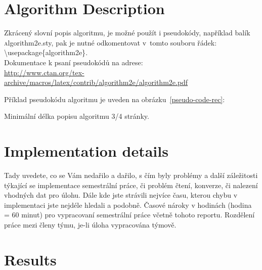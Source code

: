 \documentclass[report,11pt]{elsarticle}
\begin{document}
\section{\label{SEC:Description}Algorithm Description}

Zkrácený slovní popis algoritmu, je možné použít i pseudokódy,
například balík {\textsc algorithm2e.sty}, pak je nutné odkomentovat
v~tomto souboru řádek:\\

{\textsc \textbackslash usepackage\{algorithm2e\}}.\\

Dokumentace k psaní pseudokódů na adrese:\\

\url{http://www.ctan.org/tex-archive/macros/latex/contrib/algorithm2e/algorithm2e.pdf}

Příklad pseudokódu algoritmu je uveden na obrázku~\ref{pseudo-code-rec}:



Minimální délka popisu algoritmu 3/4 stránky.

\section{\label{SEC:Pitfalls}Implementation details}

Tady uvedete, co se Vám nedařilo a dařilo, s čím byly problémy a další
záležitosti týkající se implementace semestrální práce, či problém
čtení, konverze, či nalezení vhodných dat pro úlohu. Dále kde jste
strávili nejvíce času, kterou chybu v implementaci jste nejdéle
hledali a podobně. Časové nároky v hodinách (hodina = 60 minut) pro
vypracovaní semestrální práce včetně tohoto reportu. Rozdělení práce
mezi členy týmu, je-li úloha vypracována týmově.

\section{\label{SEC:Results}Results}
\end{document}
